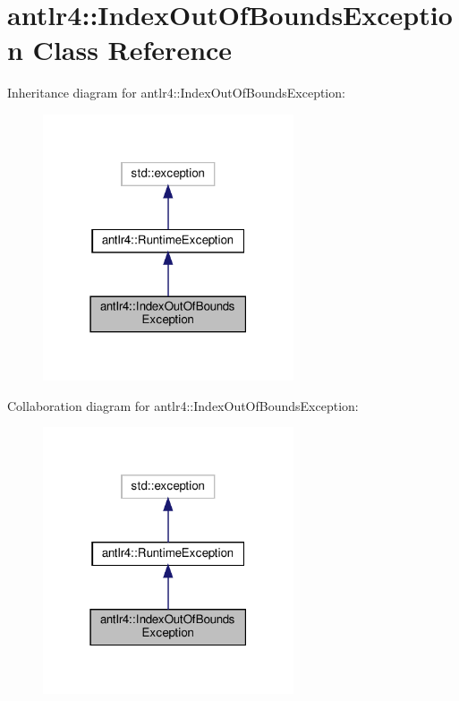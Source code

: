 \hypertarget{classantlr4_1_1IndexOutOfBoundsException}{}\section{antlr4\+:\+:Index\+Out\+Of\+Bounds\+Exception Class Reference}
\label{classantlr4_1_1IndexOutOfBoundsException}


Inheritance diagram for antlr4\+:\+:Index\+Out\+Of\+Bounds\+Exception\+:
\nopagebreak
\begin{figure}[H]
\begin{center}
\leavevmode
\includegraphics[width=210pt]{classantlr4_1_1IndexOutOfBoundsException__inherit__graph}
\end{center}
\end{figure}


Collaboration diagram for antlr4\+:\+:Index\+Out\+Of\+Bounds\+Exception\+:
\nopagebreak
\begin{figure}[H]
\begin{center}
\leavevmode
\includegraphics[width=210pt]{classantlr4_1_1IndexOutOfBoundsException__coll__graph}
\end{center}
\end{figure}
